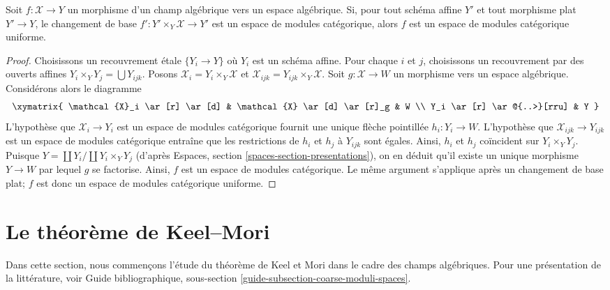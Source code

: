 \begin{lemma}
\label{lemma-check-uniform-categorical-quotient-on-affines}
Soit $f : \mathcal{X} \to Y$ un morphisme d'un champ algébrique
vers un espace algébrique. Si, pour tout schéma affine $Y'$ et tout
morphisme plat $Y' \to Y$, le changement de base
$f' : Y' \times_Y \mathcal{X} \to Y'$ est un espace de modules catégorique,
alors $f$ est un espace de modules catégorique uniforme.
\end{lemma}

\begin{proof}
Choisissons un recouvrement \'etale $\{Y_i \to Y\}$ où $Y_i$ est un schéma affine.
Pour chaque $i$ et $j$, choisissons un recouvrement par des ouverts affines
$Y_i \times_Y Y_j = \bigcup Y_{ijk}$.
Posons $\mathcal{X}_i = Y_i \times_Y \mathcal{X}$ et
$\mathcal{X}_{ijk} = Y_{ijk} \times_Y \mathcal{X}$.
Soit $g : \mathcal{X} \to W$ un morphisme vers
un espace algébrique. Considérons alors le diagramme
$$
\xymatrix{
\mathcal{X}_i \ar[r] \ar[d] & \mathcal{X} \ar[d] \ar[r]_g & W \\
Y_i \ar[r] \ar@{..>}[rru] & Y
}
$$
L'hypothèse que $\mathcal{X}_i \to Y_i$ est un espace de modules
catégorique fournit une unique flèche pointillée $h_i : Y_i \to W$.
L'hypothèse que $\mathcal{X}_{ijk} \to Y_{ijk}$ est un espace de modules
catégorique entraîne que les restrictions de $h_i$ et $h_j$ à
$Y_{ijk}$ sont égales. Ainsi, $h_i$ et $h_j$ coïncident sur $Y_i \times_Y Y_j$.
Puisque $Y = \coprod Y_i / \coprod Y_i \times_Y Y_j$
(d'après Espaces, section \ref{spaces-section-presentations}), on en déduit
qu'il existe un unique morphisme $Y \to W$ par lequel $g$ se factorise.
Ainsi, $f$ est un espace de modules catégorique. Le même argument s'applique
après un changement de base plat; $f$ est donc un espace de modules catégorique uniforme.
\end{proof}







\section{Le théorème de Keel--Mori}
\label{section-Keel-Mori}

\noindent
Dans cette section, nous commençons l'étude du théorème de Keel et Mori
dans le cadre des champs algébriques. Pour une présentation de la
littérature, voir Guide bibliographique, sous-section
\ref{guide-subsection-coarse-moduli-spaces}.

